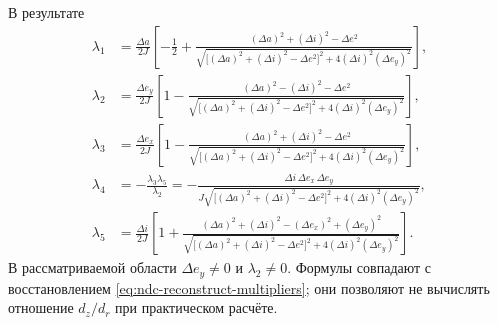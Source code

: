 В результате
\begin{equation}
\begin{aligned}
 \lambda_1&=\frac{\Delta a}{2J}\left[
 -\frac12+\frac{(\Delta a)^2+(\Delta i)^2-\Delta e^2}
 {\sqrt{\bigl[(\Delta a)^2+(\Delta i)^2-\Delta e^2\bigr]^2
                     +4(\Delta i)^2(\Delta e_y)^2}}\right],\\[2mm]
 \lambda_2&=\frac{\Delta e_y}{2J}\left[
 1-\frac{(\Delta a)^2-(\Delta i)^2-\Delta e^2}
 {\sqrt{\bigl[(\Delta a)^2+(\Delta i)^2-\Delta e^2\bigr]^2
                     +4(\Delta i)^2(\Delta e_y)^2}}\right],\\[2mm]
 \lambda_3&=\frac{\Delta e_x}{2J}\left[
 1-\frac{(\Delta a)^2+(\Delta i)^2-\Delta e^2}
 {\sqrt{\bigl[(\Delta a)^2+(\Delta i)^2-\Delta e^2\bigr]^2
                     +4(\Delta i)^2(\Delta e_y)^2}}\right],\\[2mm]
 \lambda_4&=-\frac{\lambda_3\lambda_5}{\lambda_2}
 =-\frac{\Delta i\,\Delta e_x\,\Delta e_y}
 {J\sqrt{\bigl[(\Delta a)^2+(\Delta i)^2-\Delta e^2\bigr]^2
                     +4(\Delta i)^2(\Delta e_y)^2}},\\[2mm]
 \lambda_5&=\frac{\Delta i}{2J}\left[
 1+\frac{(\Delta a)^2+(\Delta i)^2-(\Delta e_x)^2+(\Delta e_y)^2}
 {\sqrt{\bigl[(\Delta a)^2+(\Delta i)^2-\Delta e^2\bigr]^2
                     +4(\Delta i)^2(\Delta e_y)^2}}\right].
\end{aligned}
\label{eq:ndc-multipliers}
\end{equation}
В рассматриваемой области $\Delta e_y\ne0$ и $\lambda_2\ne0$.
Формулы совпадают с восстановлением
\eqref{eq:ndc-reconstruct-multipliers}; они позволяют не вычислять
отношение $d_z/d_r$ при практическом расчёте.

